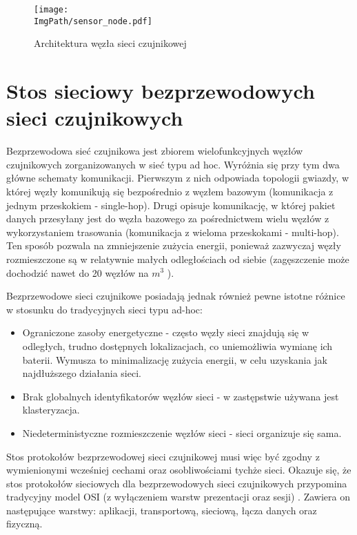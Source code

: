 \begin{figure}[H]
	\begin{center}
		\texttt{[image: \\ImgPath/sensor\_node.pdf]}
	\end{center}
	\caption{Architektura węzła sieci czujnikowej}
\end{figure}

\section{Stos sieciowy bezprzewodowych sieci czujnikowych}

Bezprzewodowa sieć czujnikowa jest zbiorem wielofunkcyjnych węzłów czujnikowych zorganizowanych w sieć typu ad hoc. Wyróżnia się przy tym dwa główne schematy komunikacji. Pierwszym z nich odpowiada topologii gwiazdy, w której węzły komunikują się bezpośrednio z węzłem bazowym (komunikacja z jednym przeskokiem - single-hop). Drugi opisuje komunikację, w której pakiet danych przesyłany jest do węzła bazowego za pośrednictwem wielu węzłów z wykorzystaniem trasowania (komunikacja z wieloma przeskokami - multi-hop). Ten sposób pozwala na zmniejszenie zużycia energii, ponieważ zazwyczaj węzły rozmieszczone są w relatywnie małych odległościach od siebie (zagęszczenie może dochodzić nawet do 20 węzłów na $m^{3}$ \cite{Shih2001}).

Bezprzewodowe sieci czujnikowe posiadają jednak również pewne istotne różnice w stosunku do tradycyjnych sieci typu ad-hoc:
\begin{itemize}
\item Ograniczone zasoby energetyczne - często węzły sieci znajdują się w odległych, trudno dostępnych lokalizacjach, co uniemożliwia wymianę ich baterii. Wymusza to minimalizację zużycia energii, w celu uzyskania jak najdłuższego działania sieci.
\item Brak globalnych identyfikatorów węzłów sieci - w zastępstwie używana jest klasteryzacja.
\item Niedeterministyczne rozmieszczenie węzłów sieci - sieci organizuje się sama.
\end{itemize}

Stos protokołów bezprzewodowej sieci czujnikowej musi więc być zgodny z wymienionymi wcześniej cechami oraz osobliwościami tychże sieci. Okazuje się, że  stos protokołów sieciowych dla bezprzewodowych sieci czujnikowych przypomina tradycyjny model OSI (z wyłączeniem warstw prezentacji oraz sesji) \cite{Akyildiz2002.09}. Zawiera on następujące warstwy: aplikacji, transportową, sieciową, łącza danych oraz fizyczną.

